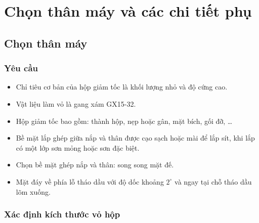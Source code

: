\chapter{Chọn thân máy và các chi tiết phụ}
\section{Chọn thân máy}
\subsection{Yêu cầu}
\begin{itemize}
    \item Chỉ tiêu cơ bản của hộp giảm tốc là khối lượng nhỏ và độ cứng cao.
    \item Vật liệu làm vỏ là gang xám GX15-32.
    \item Hộp giảm tốc bao gồm: thành hộp, nẹp hoặc gân, mặt bích, gối đỡ, \ldots
    \item Bề mặt lắp ghép giữa nắp và thân được cạo sạch hoặc mài để lắp sít, khi lắp có một lớp sơn mỏng hoặc sơn đặc biệt.
    \item Chọn bề mặt ghép nắp và thân: song song mặt đế.
    \item Mặt đáy về phía lỗ tháo dầu với độ dốc khoảng $2^\circ$ và ngay tại chỗ tháo dầu lõm xuống.
\end{itemize}

\subsection{Xác định kích thước vỏ hộp}

